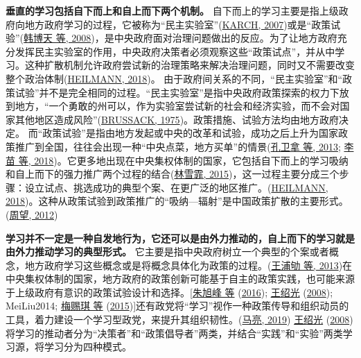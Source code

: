 \documentclass[
  12pt,
]{ctexart}
\begin{document}
\textbf{垂直的学习包括自下而上和自上而下两个机制。}
自下而上的学习主要是指上级政府向地方政府学习的过程，它被称为``民主实验室''(\protect\hyperlink{ref-Karch2007}{KARCH, 2007})或是``政策试验''(\protect\hyperlink{ref-HanBoTianShiLei2008}{韩博天 等, 2008})，是中央政府面对治理问题做出的反应。为了让地方政府充分发挥民主实验室的作用，中央政府决策者必须观察这些``政策试点''，并从中学习。这种扩散机制允许政府尝试新的治理策略来解决治理问题，同时又不需要改变整个政治体制(\protect\hyperlink{ref-Heilmann2018}{HEILMANN, 2018})。
由于政府间关系的不同，``民主实验室''和``政策试验''并不是完全相同的过程。``民主实验室''是指中央政府政策探索的权力下放到地方，``一个勇敢的州可以，作为实验室尝试新的社会和经济实验，而不会对国家其他地区造成风险''(\protect\hyperlink{ref-Brussack1975}{BRUSSACK, 1975})。政策措施、试验方法均由地方政府决定。
而``政策试验''是指由地方发起或中央的改革和试验，成功之后上升为国家政策推广到全国，往往会出现一种``中央点菜，地方买单''的情景(\protect\hyperlink{ref-KongWeiNaZhangGuang2013}{孔卫拿 等, 2013}; \protect\hyperlink{ref-LiMiaoCuiJun2018}{李苗 等, 2018})。它更多地出现在中央集权体制的国家，它包括自下而上的学习吸纳和自上而下的强力推广两个过程的结合(\protect\hyperlink{ref-LinXueFei2015}{林雪霏, 2015})，这一过程主要分成三个步骤：设立试点、挑选成功的典型个案、在更广泛的地区推广。(\protect\hyperlink{ref-Heilmann2018}{HEILMANN, 2018})。这种从政策试验到政策推广的``吸纳---辐射''是中国政策扩散的主要形式。(\protect\hyperlink{ref-ZhouWang2012}{周望, 2012})

\textbf{学习并不一定是一种自发地行为，它还可以是由外力推动的，自上而下的学习就是由外力推动学习的典型形式。}
它主要是指中央政府树立一个典型的个案或者概念，地方政府学习这些概念或是将概念具体化为政策的过程。(\protect\hyperlink{ref-WangPuQuLaiXianJin2013}{王浦劬 等, 2013})在中央集权体制的国家，地方政府的政策创新可能基于自主的政策实践，也可能来源于上级政府有意识的政策试验设计和选择。{[}\protect\hyperlink{ref-ZhuXuFengZhaoHui2016}{朱旭峰 等} (\protect\hyperlink{ref-ZhuXuFengZhaoHui2016}{2016}); \protect\hyperlink{ref-WangShaoGuang2008a}{王绍光} (\protect\hyperlink{ref-WangShaoGuang2008a}{2008}); MeiLiu2014; \protect\hyperlink{ref-MeiSiQiEtAl2015}{梅赐琪 等} (\protect\hyperlink{ref-MeiSiQiEtAl2015}{2015}){]}还有政党将``学习''视作一种政策传导和组织动员的工具，着力建设一个学习型政党，来提升其组织韧性。(\protect\hyperlink{ref-MaLiang2019}{马亮, 2019})
\protect\hyperlink{ref-WangShaoGuang2008a}{王绍光} (\protect\hyperlink{ref-WangShaoGuang2008a}{2008}) 将学习的推动者分为``决策者''和``政策倡导者''两类，并结合``实践''和``实验''两类学习源，将学习分为四种模式。
\end{document}
